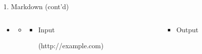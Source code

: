 \documentclass[14pt, aspectratio=169, sectionpage=simple, xclolor=table]{beamer}
\begin{document}
\begin{frame}[fragile, t]{1. Markdown (cont'd)}
\begin{itemize}
\item {}
\begin{itemize}
\item[] 

\begin{columns}
\begin{column}{0.45\textwidth}
	\vspace{1cm}
	\begin{itemize}
		\item Input
		
		\begin{code11}
			[link](http://example.com)
		\end{code11}
	\end{itemize}
\end{column}%
\hfill
\begin{column}{0.45\textwidth}
	\vspace{1cm}
	\begin{itemize}
		\item Output
		\\
		\underline{}
		
	\end{itemize}
\end{column}%
\end{columns}%
\end{itemize}
\end{itemize}




\end{frame}
\end{document}
